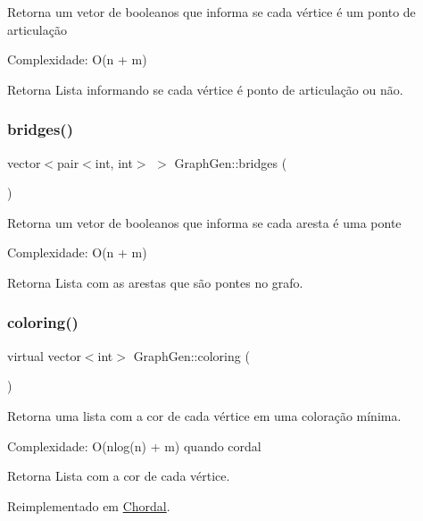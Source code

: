 Retorna um vetor de booleanos que informa se cada vértice é um ponto de articulação

Complexidade\+: O(n + m) \begin{DoxyReturn}{Retorna}
Lista informando se cada vértice é ponto de articulação ou não. 
\end{DoxyReturn}
\mbox{\label{classGraphGen_ac80b65f7234db5bc163c7736aa0f561a}} 
\subsubsection{\texorpdfstring{bridges()}{bridges()}}
{\footnotesize\ttfamily vector$<$pair$<$int, int$>$ $>$ Graph\+Gen\+::bridges (\begin{DoxyParamCaption}{ }\end{DoxyParamCaption})}

Retorna um vetor de booleanos que informa se cada aresta é uma ponte

Complexidade\+: O(n + m) \begin{DoxyReturn}{Retorna}
Lista com as arestas que são pontes no grafo. 
\end{DoxyReturn}
\mbox{\label{classGraphGen_ad44c80646f694460fafa3e3657beb4d0}} 
\subsubsection{\texorpdfstring{coloring()}{coloring()}}
{\footnotesize\ttfamily virtual vector$<$int$>$ Graph\+Gen\+::coloring (\begin{DoxyParamCaption}{ }\end{DoxyParamCaption})\hspace{0.3cm}{\ttfamily [virtual]}}

Retorna uma lista com a cor de cada vértice em uma coloração mínima.

Complexidade\+: O(nlog(n) + m) quando cordal \begin{DoxyReturn}{Retorna}
Lista com a cor de cada vértice. 
\end{DoxyReturn}


Reimplementado em \hyperlink{classChordal_acac4822a1eb3376c29f3d193baaec91f}{Chordal}.

\mbox{\label{classGraphGen_a36741424a266249c915f29fbab96175c}} 
